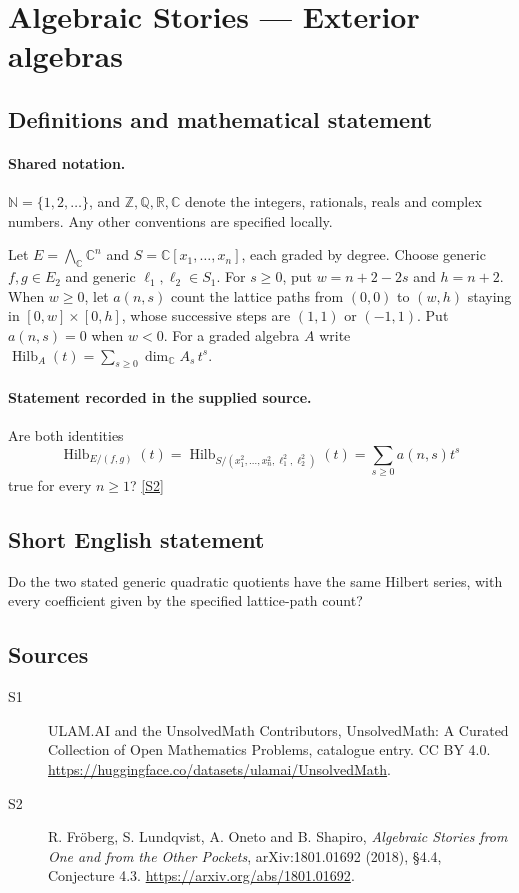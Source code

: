 \documentclass[11pt]{article}
\newcommand{\sref}[2]{\hyperlink{source:#1:#2}{[S#2]}}
\begin{document}
\section{Algebraic Stories — Exterior algebras}\label{statement}

\subsection{Definitions and mathematical statement}

\paragraph{Shared notation.}$\mathbb N=\{1,2,\ldots\}$, and $\mathbb Z,\mathbb Q,\mathbb R,\mathbb C$ denote the integers, rationals, reals and complex numbers. Any other conventions are specified locally.


Let $E=\bigwedge_{\mathbb C}\mathbb C^n$ and $S=\mathbb C[x_1,\ldots,x_n]$, each graded by degree. Choose generic $f,g\in E_2$ and generic $\ell_1,\ell_2\in S_1$. For $s\geq0$, put $w=n+2-2s$ and $h=n+2$. When $w\geq0$, let $a(n,s)$ count the lattice paths from $(0,0)$ to $(w,h)$ staying in $[0,w]\times[0,h]$, whose successive steps are $(1,1)$ or $(-1,1)$. Put $a(n,s)=0$ when $w<0$. For a graded algebra $A$ write $\operatorname{Hilb}_A(t)=\sum_{s\geq0}\dim_{\mathbb C}A_s\,t^s$.
\paragraph{Statement recorded in the supplied source.}
Are both identities
\[\operatorname{Hilb}_{E/(f,g)}(t)=\operatorname{Hilb}_{S/(x_1^2,\ldots,x_n^2,\ell_1^2,\ell_2^2)}(t)=\sum_{s\geq0}a(n,s)t^s
\]
true for every $n\geq1$? \sref{statement}{2}
\subsection{Short English statement}
Do the two stated generic quadratic quotients have the same Hilbert series, with every coefficient given by the specified lattice-path count?
\subsection{Sources}
\begin{description}
\item[\hypertarget{source:statement:1}{S1}] ULAM.AI and the UnsolvedMath Contributors, UnsolvedMath: A Curated Collection of Open Mathematics Problems, catalogue entry. CC BY 4.0. \url{https://huggingface.co/datasets/ulamai/UnsolvedMath}.
\item[\hypertarget{source:statement:2}{S2}] R. Fröberg, S. Lundqvist, A. Oneto and B. Shapiro, \emph{Algebraic Stories from One and from the Other Pockets}, arXiv:1801.01692 (2018), §4.4, Conjecture 4.3. \url{https://arxiv.org/abs/1801.01692}.
\end{description}
\label{end:statement}
\end{document}
